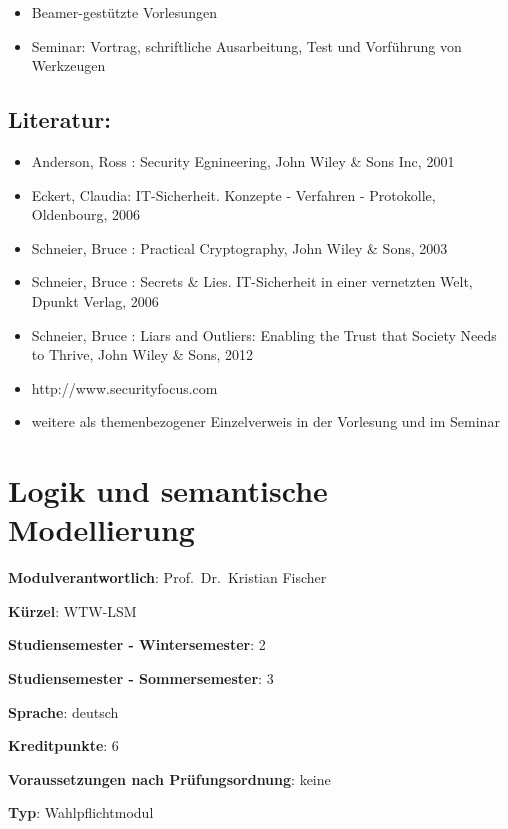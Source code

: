 \begin{itemize}
\tightlist
\item
  Beamer-gestützte Vorlesungen
\item
  Seminar: Vortrag, schriftliche Ausarbeitung, Test und Vorführung von
  Werkzeugen
\end{itemize}

\section*{Literatur:}\label{literatur-19}

\begin{itemize}
\tightlist
\item
  Anderson, Ross : Security Egnineering, John Wiley \& Sons Inc, 2001
\item
  Eckert, Claudia: IT-Sicherheit. Konzepte - Verfahren - Protokolle,
  Oldenbourg, 2006
\item
  Schneier, Bruce : Practical Cryptography, John Wiley \& Sons, 2003
\item
  Schneier, Bruce : Secrets \& Lies. IT-Sicherheit in einer vernetzten
  Welt, Dpunkt Verlag, 2006
\item
  Schneier, Bruce : Liars and Outliers: Enabling the Trust that Society
  Needs to Thrive, John Wiley \& Sons, 2012
\item
  http://www.securityfocus.com
\item
  weitere als themenbezogener Einzelverweis in der Vorlesung und im
  Seminar
\end{itemize}

\chapter{Logik und semantische
Modellierung}\label{logik-und-semantische-modellierung}

\begin{modulHead}
\textbf{Modulverantwortlich}: Prof.~Dr.~Kristian
Fischer
\end{modulHead}
\begin{modulHead}
\textbf{Kürzel}:
WTW-LSM
\end{modulHead}
\begin{modulHead}
\textbf{Studiensemester -
Wintersemester}:
2
\end{modulHead}
\begin{modulHead}
\textbf{Studiensemester -
Sommersemester}: 3
\end{modulHead}
\begin{modulHead}
\textbf{Sprache}:
deutsch
\end{modulHead}
\begin{modulHead}
\textbf{Kreditpunkte}:
6
\end{modulHead}
\begin{modulHead}
\textbf{Voraussetzungen nach
Prüfungsordnung}: keine
\end{modulHead}
\begin{modulHead}
\textbf{Typ}:
Wahlpflichtmodul
\end{modulHead}


